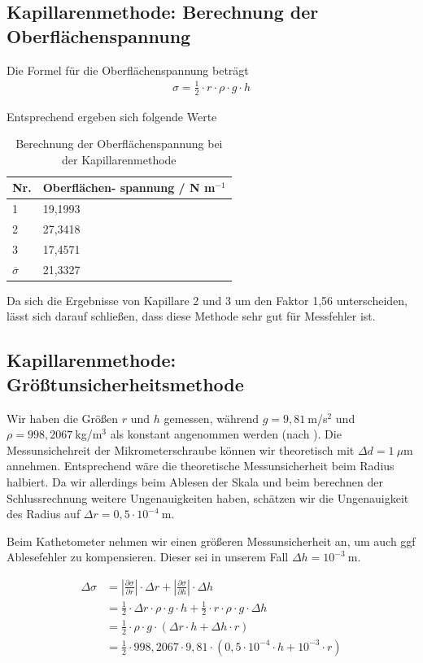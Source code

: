 \documentclass{article}
\begin{document}
\subsection{Kapillarenmethode: Berechnung der Oberflächenspannung}


Die Formel für die Oberflächenspannung beträgt
\begin{align*}
\sigma = \frac12 \cdot r\cdot \rho \cdot g \cdot h
\end{align*}

Entsprechend ergeben sich folgende Werte

\begin{table}[H]
\caption{Berechnung der Oberflächenspannung bei der Kapillarenmethode}

\begin{tabular}{ll}
Nr. & \shortstack[l]{Oberflächen-\\spannung / N m${}^{-1}$} \\
\hline
1 & 19,1993 \\
2 & 27,3418 \\
3 & 17,4571 \\
\hline
$\overline{\sigma}$ & 21,3327
\end{tabular}
\end{table}
Da sich die Ergebnisse von Kapillare 2 und 3 um den Faktor 1,56 unterscheiden, lässt sich darauf schließen, dass diese Methode sehr gut für Messfehler ist.

\subsection{Kapillarenmethode: Größtunsicherheitsmethode}

Wir haben die Größen $r$ und $h$ gemessen, während $g = 9,81~$m/s${}^2$ und $\rho=998,2067~$kg/m${}^3$ als konstant angenommen werden (nach \cite{wikipedia}). Die Messunsichehreit der Mikrometerschraube können wir theoretisch mit $\Delta d = 1~\mu $m annehmen. Entsprechend wäre die theoretische Messunsicherheit beim Radius halbiert. Da wir allerdings beim Ablesen der Skala und beim berechnen der Schlussrechnung weitere Ungenauigkeiten haben, schätzen wir die Ungenauigkeit des Radius auf $\Delta r = 0,5 \cdot 10^{-4}~$m.

Beim Kathetometer nehmen wir einen größeren Messunsicherheit an, um auch ggf Ablesefehler zu kompensieren. Dieser sei in unserem Fall $\Delta h = 10^{-3}~$m.

\begin{align*}
\Delta \sigma &= \left|\frac{\partial \sigma}{\partial r}\right| \cdot \Delta r + \left|\frac{\partial \sigma}{\partial h}\right| \cdot \Delta h \\ 
&= \frac12 \cdot \Delta r \cdot \rho \cdot g \cdot h + \frac12 \cdot r \cdot \rho \cdot g \cdot \Delta h \\
&= \frac12 \cdot \rho \cdot g \cdot \left( \Delta r \cdot h + \Delta h \cdot r\right) \\
&= \frac12 \cdot 998,2067 \cdot 9,81 \cdot \left( 0,5\cdot 10^{-4} \cdot h + 10^{-3} \cdot r\right)
\end{align*}
\end{document}
